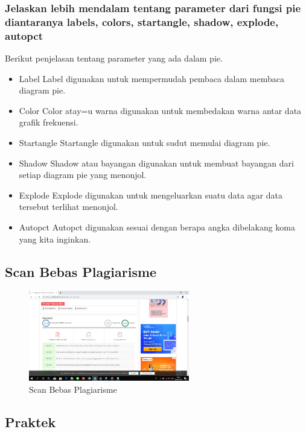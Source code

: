 \subsubsection{Jelaskan lebih mendalam tentang parameter dari fungsi pie diantaranya labels, colors, startangle, shadow, explode, autopct}
\hfill \break
Berikut penjelasan tentang parameter yang ada dalam pie.
\begin{itemize}
    \item Label
    Label digunakan untuk mempermudah pembaca dalam membaca diagram pie.

    \item Color
    Color atay=u warna digunakan untuk membedakan warna antar data grafik frekuensi.

    \item Startangle
    Startangle digunakan untuk sudut memulai diagram pie.

    \item Shadow
    Shadow atau bayangan digunakan untuk membuat bayangan dari setiap diagram pie yang menonjol.

    \item Explode
    Explode digunakan untuk mengeluarkan suatu data agar data tersebut terlihat menonjol.

    \item Autopct
    Autopct digunakan sesuai dengan berapa angka dibelakang koma yang kita inginkan.
\end{itemize}

\subsection{Scan Bebas Plagiarisme}
\begin{figure}[H]
\centering
\includegraphics[width=7cm]{figures/6/1174008/bebasplagiarisme.png}
\caption{Scan Bebas Plagiarisme}
\label{Bebas Plagiarisme}
\end{figure}

\subsection{Praktek}
